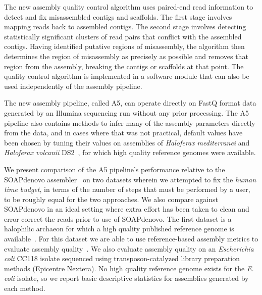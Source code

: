 \documentclass[10pt]{article}
\begin{document}
The new assembly quality control algorithm uses paired-end read information
to detect and fix misassembled contigs and scaffolds. The first stage involves mapping reads back to assembled contigs.
The second stage involves detecting statistically significant clusters of read pairs that conflict with the
assembled contigs. Having identified putative regions of misassembly, the algorithm then determines the 
region of misassembly as precisely as possible and removes that region from the assembly, breaking the contigs
or scaffolds at that point. The quality control algorithm is implemented in a software module that can also be used 
independently of the assembly pipeline.

The new assembly pipeline, called A5, can operate directly on FastQ format data generated by an Illumina sequencing run
without any prior processing. The A5 pipeline also contains methods to infer many of the assembly parameters directly
from the data, and in cases where that was not practical, default values have been chosen by tuning their values on 
assemblies of \textit{Haloferax mediterranei} and \textit{Haloferax volcanii} DS2~\cite{Hartman2010}, for which high quality reference genomes were available.

We present comparison of the A5 pipeline's performance relative to the SOAPdenovo assembler~\cite{Li2010} on two datasets wherein we attempted to fix the \textit{human time budget}, in terms of the number of steps that must be performed by a user, to be roughly equal for the two approaches. We also compare against SOAPdenovo in an ideal setting where extra effort has been taken to clean and error correct the reads prior to use of SOAPdenovo.
The first dataset
is a halophilic archaeon for which a high quality published reference genome is available~\cite{Hartman2010}. For this dataset we are able to use
reference-based assembly metrics to evaluate assembly quality~\cite{Darling2011}. We also evaluate assembly quality on an 
\textit{Escherichia coli} CC118 isolate sequenced using transposon-catalyzed library preparation methods (Epicentre Nextera). 
No high quality reference genome exists for the \textit{E. coli} isolate, so we report basic descriptive statistics for assemblies
generated by each method.
\end{document}
